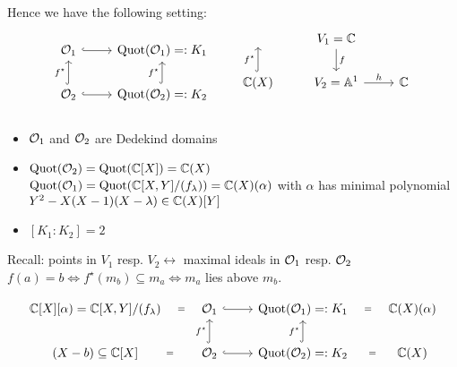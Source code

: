 \begin{conc}
Hence we have the following setting:
\[
\begin{tikzcd}
\O_1 \arrow[r, hook] & \Quot(\O_1)=:K_1\\
\O_2 \arrow[u, hook, "f^\star"] \arrow[r, hook] & \Quot(\O_2)=:K_2 \arrow[u, hook, "f^\star"]
\end{tikzcd}
\quad \quad 
\begin{tikzcd}
\ &V_1=\C \arrow[d, "f"]&\ \\
\C(X) \arrow[u, hook, "f^\star"]&V_2=\Aff^1 \arrow[r, "h"]& \C \\
\end{tikzcd}
\]
\begin{itemize}
\item $\mathcal{O}_1$ and $\mathcal{O}_2$ are Dedekind domains
\item $\operatorname{Quot}(\mathcal{O}_2)=\operatorname{Quot}(\mathbb{C}[X])=\mathbb{C}(X)$\\
$\operatorname{Quot}(\mathcal{O}_1)=\operatorname{Quot}(\mathbb{C}[X,Y]/(f_\lambda)) =\mathbb{C}(X)(\alpha)$ with $\alpha$ has minimal polynomial $Y^2-X(X-1)(X-\lambda) \in \mathbb{C}(X)[Y]$
\item $[K_1:K_2]=2$
\end{itemize}
\end{conc}

Recall: points in $V_1$ resp. $V_2 \leftrightarrow $ maximal ideals in $\mathcal{O}_1$ resp. $\mathcal{O}_2$\\
$f(a)=b \iff f^\star(m_b) \subseteq m_a \iff m_a$ lies above $m_b$.

\[
\begin{tikzcd}
\C[X][\alpha)=\C[X,Y]/(f_\lambda) \arrow[draw=none]{r}[sloped,auto=false]{=} &\O_1 \arrow[r, hook] & \Quot(\O_1)=:K_1 \arrow[draw=none]{r}[sloped,auto=false]{=} & \C(X)(\alpha)\\
(X-b) \subseteq \C[X] \arrow[draw=none]{r}[sloped,auto=false]{=} &\O_2 \arrow[u, hook, "f^\star"] \arrow[r, hook] & \Quot(\O_2)=:K_2 \arrow[u, hook, "f^\star"] \arrow[draw=none]{r}[sloped,auto=false]{=}&\C(X) 
\end{tikzcd}
\]


